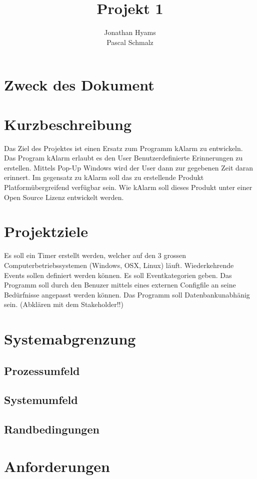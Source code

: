 \documentclass[a4paper,10pt]{report}
\title{Projekt 1}
\author{Jonathan Hyams \\Pascal Schmalz}
\begin{document}
\maketitle
\tableofcontents

\begin{abstract}
\end{abstract}
\section{Zweck des Dokument}
\section{Kurzbeschreibung}
Das Ziel des Projektes ist einen Ersatz zum Programm kAlarm zu entwickeln.
Das Program kAlarm erlaubt es den User Benutzerdefinierte Erinnerungen zu erstellen. Mittels Pop-Up Windows wird der User dann zur gegebenen Zeit daran erinnert.
Im gegensatz zu kAlarm soll das zu erstellende Produkt Platformübergreifend verfügbar sein. Wie kAlarm soll dieses Produkt unter einer Open Source Lizenz entwickelt werden.
\section{Projektziele}
Es soll ein Timer erstellt werden, welcher auf den 3 grossen Computerbetriebssystemen (Windows, OSX, Linux)  läuft.
Wiederkehrende Events sollen definiert werden können.
Es soll Eventkategorien geben.
Das Programm soll durch den Benuzer mittels  eines externen Configfile an seine Bedürfnisse angepasst werden können.
Das Programm soll Datenbankunabhänig sein. (Abklären mit dem Stakeholder!!)
\section {Systemabgrenzung}
\subsection{Prozessumfeld}
\subsection{Systemumfeld}
\subsection{Randbedingungen}
\section{Anforderungen}
\end{document}
